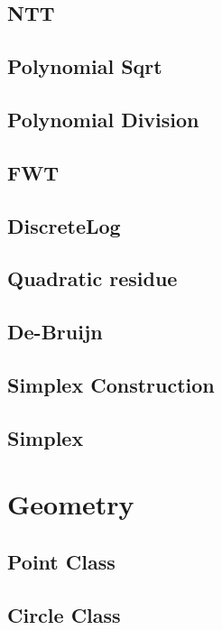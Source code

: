 \documentclass[a4paper,10pt,twocolumn,oneside]{article}
\begin{document}
\subsection{NTT}

\subsection{Polynomial Sqrt}

\subsection{Polynomial Division}

\subsection{FWT}

\subsection{DiscreteLog}

\subsection{Quadratic residue}

\subsection{De-Bruijn}

\subsection{Simplex Construction}

\subsection{Simplex}


\section{Geometry}
\subsection{Point Class}

\subsection{Circle Class}

\end{document}
